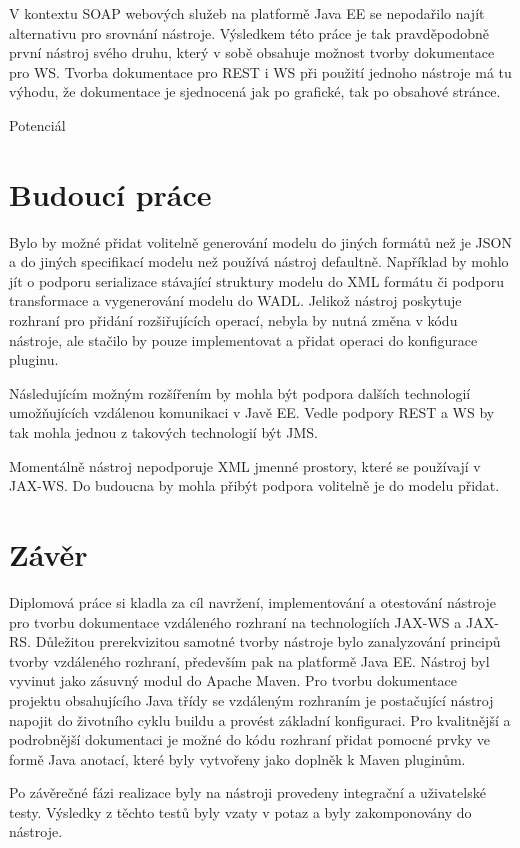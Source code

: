 \documentclass[11pt,twoside,a4paper]{book}
\begin{document}
V kontextu SOAP webových služeb na platformě Java EE se nepodařilo najít alternativu pro
srovnání nástroje. Výsledkem této práce je tak pravděpodobně první nástroj svého druhu,
který v sobě obsahuje možnost tvorby dokumentace pro WS. Tvorba dokumentace pro REST
i WS při použití jednoho nástroje má tu výhodu, že dokumentace je sjednocená jak po
grafické, tak po obsahové stránce.

Potenciál


\chapter{Budoucí práce}

Bylo by možné přidat volitelně generování modelu do jiných formátů než je JSON a do jiných
specifikací modelu než používá nástroj defaultně. Například by mohlo jít o podporu
serializace stávající struktury modelu do XML formátu či podporu transformace a
vygenerování modelu do WADL. Jelikož nástroj poskytuje rozhraní pro přidání rozšiřujících
operací, nebyla by nutná změna v kódu nástroje, ale stačilo by pouze implementovat a přidat
operaci do konfigurace pluginu.

Následujícím možným rozšířením by mohla být podpora dalších technologií umožňujících
vzdálenou komunikaci v Javě EE. Vedle podpory REST a WS by tak mohla jednou z
takových technologií být JMS.

Momentálně nástroj nepodporuje XML jmenné prostory, které se používají v JAX-WS. Do
budoucna by mohla přibýt podpora volitelně je do modelu přidat.

\chapter{Závěr}

Diplomová práce si kladla za cíl navržení, implementování a otestování nástroje pro tvorbu
dokumentace vzdáleného rozhraní na technologiích JAX-WS a JAX-RS. Důležitou
prerekvizitou samotné tvorby nástroje bylo zanalyzování principů tvorby
vzdáleného rozhraní, především pak na platformě Java EE. Nástroj byl vyvinut jako zásuvný modul do Apache
Maven. Pro tvorbu dokumentace projektu obsahujícího Java třídy se vzdáleným rozhraním je
postačující nástroj napojit do životního cyklu buildu a provést základní konfiguraci. Pro
kvalitnější a podrobnější dokumentaci je možné do kódu rozhraní přidat pomocné prvky ve
formě Java anotací, které byly vytvořeny jako doplněk k Maven pluginům.

Po závěrečné fázi realizace byly na nástroji provedeny integrační a uživatelské testy.
Výsledky z těchto testů byly vzaty v potaz a byly zakomponovány do nástroje.
\end{document}
